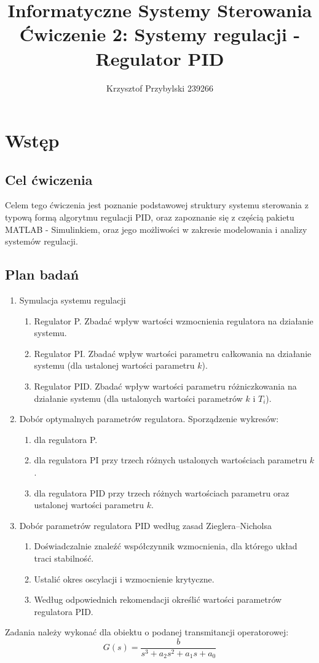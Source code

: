 \documentclass[a4paper,10pt]{article}
\title{Informatyczne Systemy Sterowania \\ \large Ćwiczenie 2: Systemy regulacji - Regulator PID}
\author{Krzysztof Przybylski 239266}
\begin{document}
\maketitle

\section{Wstęp}\label{sec:wstęp}
\subsection{Cel ćwiczenia}
Celem tego ćwiczenia jest poznanie podstawowej struktury systemu sterowania z typową formą algorytmu regulacji PID, oraz zapoznanie się z częścią pakietu M\small ATLAB \normalsize - Simulinkiem, oraz jego możliwości w zakresie modelowania i analizy systemów regulacji.

\subsection{Plan badań} 
\begin{enumerate}
	\item Symulacja systemu regulacji
	\begin{enumerate}
		\item Regulator P. Zbadać wpływ wartości wzmocnienia regulatora na działanie systemu. 
	    \item Regulator   PI.   Zbadać  wpływ   wartości   parametru   całkowania   na   działanie   systemu 
       (dla ustalonej wartości parametru $k$). 
    	\item Regulator PID. Zbadać wpływ wartości parametru różniczkowania na działanie 
       systemu (dla ustalonych wartości parametrów $k$ i $T_i$). 
	\end{enumerate}
	\item Dobór optymalnych parametrów regulatora. Sporządzenie wykresów:
	\begin{enumerate}
		\item dla regulatora P. 
    	\item dla regulatora PI przy trzech różnych ustalonych wartościach parametru $k$.  
    	\item dla regulatora PID przy trzech różnych wartościach parametru oraz ustalonej wartości parametru $k$.
	\end{enumerate}
	\item Dobór parametrów regulatora PID według zasad Zieglera–Nicholsa
	\begin{enumerate}
		\item Doświadczalnie znaleźć współczynnik wzmocnienia, dla którego układ traci stabilność.
		\item Ustalić okres oscylacji i wzmocnienie krytyczne.
		\item Według odpowiednich rekomendacji określić wartości parametrów regulatora PID.
	\end{enumerate}
\end{enumerate}
Zadania należy wykonać dla obiektu o podanej transmitancji operatorowej:
\begin{equation} \label{eqn:transOS}
	G(s) = \frac{b}{s^3 + a_2 s^2 + a_1 s + a_0}
\end{equation}
\end{document}
